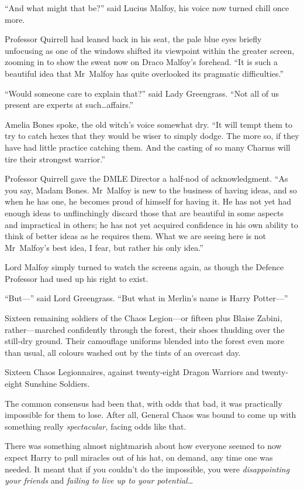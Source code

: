 “And what might that be?” said Lucius Malfoy, his voice now turned chill once more.

Professor Quirrell had leaned back in his seat, the pale blue eyes briefly unfocusing as one of the windows shifted its viewpoint within the greater screen, zooming in to show the sweat now on Draco Malfoy’s forehead. “It is such a beautiful idea that Mr~Malfoy has quite overlooked its pragmatic difficulties.”

“Would someone care to explain that?” said Lady Greengrass. “Not all of us present are experts at such…affairs.”

Amelia Bones spoke, the old witch’s voice somewhat dry. “It will tempt them to try to catch hexes that they would be wiser to simply dodge. The more so, if they have had little practice catching them. And the casting of so many Charms will tire their strongest warrior.”

Professor Quirrell gave the DMLE Director a half-nod of acknowledgment. “As you say, Madam Bones. Mr~Malfoy is new to the business of having ideas, and so when he has one, he becomes proud of himself for having it. He has not yet had enough ideas to unflinchingly discard those that are beautiful in some aspects and impractical in others; he has not yet acquired confidence in his own ability to think of better ideas as he requires them. What we are seeing here is not Mr~Malfoy’s best idea, I fear, but rather his only idea.”

Lord Malfoy simply turned to watch the screens again, as though the Defence Professor had used up his right to exist.

“But—” said Lord Greengrass. “But what in Merlin’s name is Harry Potter—”

\later

Sixteen remaining soldiers of the Chaos Legion—or fifteen plus Blaise Zabini, rather—marched confidently through the forest, their shoes thudding over the still-dry ground. Their camouflage uniforms blended into the forest even more than usual, all colours washed out by the tints of an overcast day.

Sixteen Chaos Legionnaires, against twenty-eight Dragon Warriors and twenty-eight Sunshine Soldiers.

The common consensus had been that, with odds that bad, it was practically impossible for them to lose. After all, General Chaos was bound to come up with something really \emph{spectacular,} facing odds like that.

There was something almost nightmarish about how everyone seemed to now expect Harry to pull miracles out of his hat, on demand, any time one was needed. It meant that if you couldn’t do the impossible, you were \emph{disappointing your friends} and \emph{failing to live up to your potential…}

